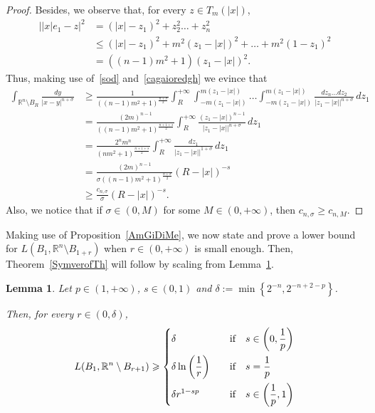 \documentclass[12pt]{article}
\newcommand{\R}{\mathbb{R}}
\numberwithin{equation}{section}
\newtheorem{lem}[thm]{Lemma}
\renewcommand{\leq}{\leqslant}
\renewcommand{\geq}{\geqslant}
\begin{document}
\begin{appendix}
\begin{proof}
Besides, we observe that, for every $z\in T_m(\left|x\right|)$,
\begin{equation}\label{cagaioredgh}
\begin{split}
\left| \left|x\right|e_1-z \right|^2&=\left(\left|x\right|-z_1\right)^2+z_2^2\dots +z_{n}^2\\
&\leq \left(\left|x\right|-z_1\right)^2+m^2\left(z_1-\left|x\right|\right)^{2}+\dots +m^2\left(1-z_1\right)^2 \\  
&= ((n-1)m^2+1)\left(z_1-\left|x\right|\right)^2.
\end{split}
\end{equation}
Thus, making use of~\eqref{sod} and~\eqref{cagaioredgh} we evince that  
\begin{equation}\label{sordina}
\begin{split}
\int_{\R^n\setminus B_R} \frac{dy}{\left|x-y\right|^{n+\sigma}}&\geq \frac{1}{((n-1)m^2+1)^{\frac{n+\sigma}{2}}}\int_{R}^{+\infty}\int_{-m(z_1-\left|x\right|)}^{m(z_1-\left|x\right|)}\dots\int_{-m(z_1-\left|x\right|)}^{m(z_1-\left|x\right|)}\frac{dz_{n}\dots d z_2}{\left|z_1-\left|x\right|\right|^{n+\sigma}}\,dz_1 \\ 
&= \frac{(2m)^{n-1}}{((n-1)m^2+1)^{\frac{n+1+s}{2}}}\int_{R}^{+\infty}\frac{(z_1-\left|x\right|)^{n-1}}{\left|z_1-\left|x\right|\right|^{n+\sigma}}\,dz_1 \\ 
&=\frac{2^{n} m^n}{(n m^2+1)^{\frac{n+1+s}{2}}}\int_{R}^{+\infty}\frac{d z_1}{\left|z_1-\left|x\right|\right|^{1+\sigma}}\,dz_1 \\ 
&=\frac{(2m)^{n-1}}{\sigma((n-1)m^2+1)^{\frac{n+\sigma}{2}}}(R-\left|x\right|)^{-s}\\
&\geq \frac{c_{n,\sigma}}{\sigma}(R-\left|x\right|)^{-s}.
\end{split}
\end{equation}
Also, we notice that if $\sigma\in (0,M)$ for some $M\in(0,+\infty)$, then $c_{n,\sigma}\geq c_{n,M}$. 
\end{proof}

Making use of Proposition~\ref{AmGiDiMe}, we now state and prove a lower bound  for $L(B_1,\R^n\setminus B_{1+r})$ when $r\in (0,+\infty)$ is small enough. Then, Theorem~\ref{SymverofTh} will follow by scaling from Lemma~\ref{gligliredght}.
    
\begin{lem}\label{gligliredght}
Let $p\in (1,+\infty)$, $s\in (0,1)$ and $\delta:=\min\left\lbrace 2^{-n}, 2^{-n+2-p} \right\rbrace$. 

Then, for every $r\in \left(0,\delta\right)$,
\begin{equation*}
L(B_1,\R^n\setminus B_{r+1})\geq\begin{dcases}
\delta\quad &\mbox{if}\quad s\in \left(0,\frac{1}{p}\right)\\
\delta\ln\left(\frac{1}{r}\right)\quad &\mbox{if}\quad s=\frac{1}{p}\\
\delta r^{1-sp}\quad &\mbox{if}\quad s\in \left(\frac{1}{p},1\right)
\end{dcases}  
\end{equation*}
\end{lem}


\end{appendix}
\end{document}
